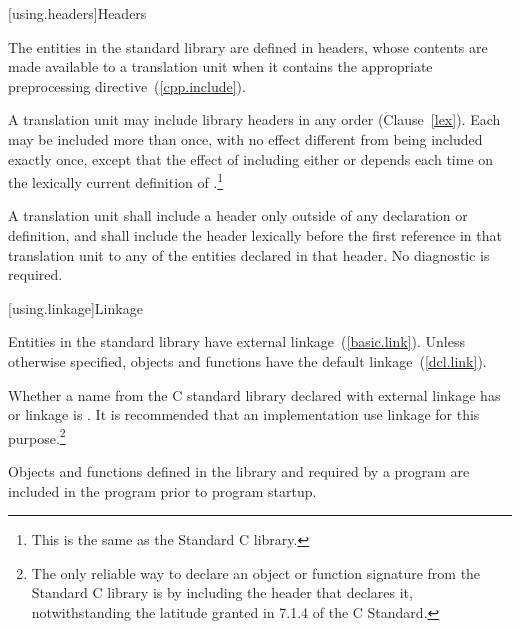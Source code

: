 [using.headers]{Headers}

\pnum
The entities in the \Cpp standard library are defined in headers,
whose contents are made available to a translation unit when it contains the appropriate
%
preprocessing directive~(\ref{cpp.include}).%
%

\pnum
A translation unit may include library headers in any order (Clause~\ref{lex}).
%
Each may be included more than once, with no effect different from
being included exactly once, except that the effect of including either
or
depends each time on the lexically
%
%
%
%
current definition of
%
%
.\footnote{This is the same as the Standard C library.}

\pnum
A translation unit shall include a header only outside of any
%
declaration or definition, and shall include the header lexically
before the first reference in that translation unit to any of the entities
declared in that header. No diagnostic is required.

[using.linkage]{Linkage}

\pnum
Entities in the \Cpp standard library have external linkage~(\ref{basic.link}).
Unless otherwise specified, objects and functions have the default
linkage~(\ref{dcl.link}).

\pnum
{}%
Whether a name from the C standard library declared with
external linkage has
%
%
%
or
%
linkage is . It is recommended that an
implementation use
linkage for this purpose.\footnote{The only reliable way to declare an object or
function signature from the Standard C library is by including the header that
declares it, notwithstanding the latitude granted in 7.1.4 of the C
Standard.}

\pnum
Objects and functions
defined in the library and required by a \Cpp program are included in
the program prior to program startup.

